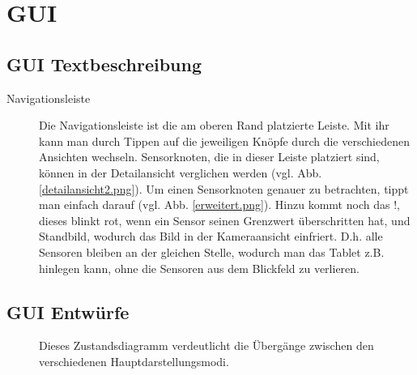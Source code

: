 \section{GUI}

\subsection{GUI Textbeschreibung}
\begin{description}
	\item [Navigationsleiste]
			Die Navigationsleiste ist die am oberen Rand platzierte Leiste. Mit ihr kann man durch Tippen auf die jeweiligen Knöpfe durch die verschiedenen Ansichten wechseln. Sensorknoten, die in dieser Leiste platziert sind, können in der Detailansicht verglichen werden (vgl. Abb. \ref{detailansicht2.png}). Um einen Sensorknoten genauer zu betrachten, tippt man einfach darauf (vgl. Abb. \ref{erweitert.png}). Hinzu kommt noch das \glqq !\grqq , dieses blinkt rot, wenn ein Sensor seinen Grenzwert überschritten hat, und \glqq Standbild\grqq , wodurch das Bild in der Kameraansicht einfriert. D.h. alle Sensoren bleiben an der gleichen Stelle, wodurch man das Tablet z.B. hinlegen kann, ohne die Sensoren aus dem Blickfeld zu verlieren.
\end{description}


\newpage
\subsection{GUI Entwürfe}
\begin{figure}[h]
	\begin{center}
	\end{center}
	\caption{Dieses Zustandsdiagramm verdeutlicht die 
		Übergänge zwischen den verschiedenen Hauptdarstellungsmodi.}
	\label{GUI_Zustaende.pdf}
\end{figure}

\clearpage